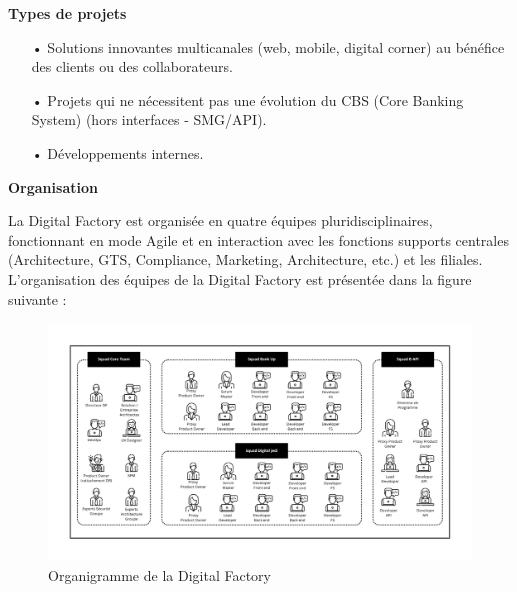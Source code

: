 \textbf{\large{Types de projets}}
\medskip
\begin{itemize}
    \item[•] Solutions innovantes multicanales (web, mobile, digital corner) au bénéfice des clients ou des collaborateurs.
    \item[•] Projets qui ne nécessitent pas une évolution du CBS (Core Banking System) (hors interfaces - SMG/API).
    \item[•] Développements internes.\\
\end{itemize}

\textbf{\large{Organisation}}

\medskip
La Digital Factory est organisée en quatre équipes pluridisciplinaires, fonctionnant en mode Agile et en interaction avec les fonctions supports centrales (Architecture, GTS, Compliance, Marketing, Architecture, etc.) et les filiales.\\

L'organisation des équipes de la Digital Factory est présentée dans la figure suivante :

\begin{figure}[!h]
    \centering
        \includegraphics[width=15cm]{images/contexte/Difa.png}
        \caption{Organigramme de la Digital Factory}
\end{figure}

